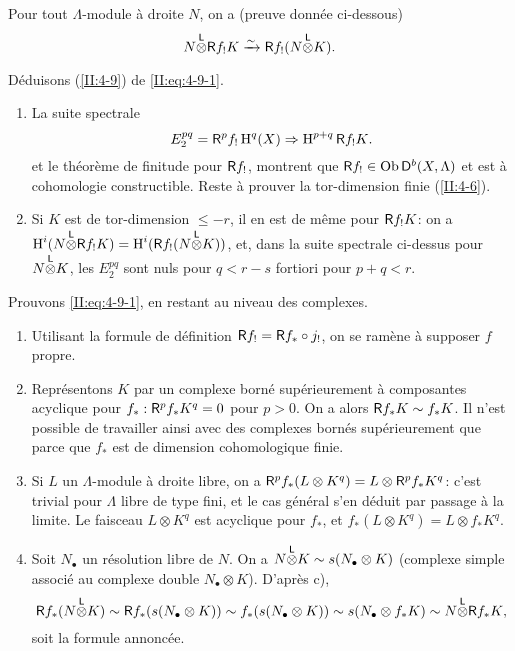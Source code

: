 \documentclass[oneside]{book}
\begin{document}
Pour tout $\Lambda$-module \`a droite $N$, on a (preuve donn\'ee ci-dessous) 
\begin{equation}\label{II:eq:4-9-1}
  N{\overset{\mathsf{L}}{\otimes}} \mathsf{R} f_! K \xrightarrow\sim \mathsf{R} f_! (N{\overset{\mathsf{L}}{\otimes}} K) \text{.}
\end{equation}

D\'eduisons (\ref{II:4-9}) de \eqref{II:eq:4-9-1}. 
\begin{enumerate}[\indent a)]
  \item La suite spectrale 
    \[
      E_2^{p q} = \mathsf{R}^p f_! \operatorname{H}^q(X) \Rightarrow \operatorname{H}^{p+q} \mathsf{R} f_! K \text{.}
    \]
    et le th\'eor\`eme de finitude pour $\mathsf{R} f_!$, montrent que 
    $\mathsf{R} f_!\in \operatorname{Ob} \mathsf{D}^b(X,\Lambda)$ et est \`a cohomologie constructible. 
    Reste \`a prouver la tor-dimension finie (\ref{II:4-6}). 
  \item Si $K$ est de tor-dimension $\leqslant -r$, il en est de m\^eme pour 
    $\mathsf{R} f_! K$: on a $\operatorname{H}^i(N{\overset{\mathsf{L}}{\otimes}} \mathsf{R} f_! K) = \operatorname{H}^i(\mathsf{R} f_!(N{\overset{\mathsf{L}}{\otimes}} K))$, 
    et, dans la suite spectrale ci-dessus pour $N{\overset{\mathsf{L}}{\otimes}} K$, les 
    $E_2^{p q}$ sont nuls pour $q<r-s$ fortiori pour $p+q<r$. 
\end{enumerate}

Prouvons \eqref{II:eq:4-9-1}, en restant au niveau des complexes. 
\begin{enumerate}[\indent a)]
  \item Utilisant la formule de d\'efinition $\mathsf{R} f_! = \mathsf{R} f_*\circ j_!$, on se 
    ram\`ene \`a supposer $f$ propre. 
  \item Repr\'esentons $K$ par un complexe born\'e 
    sup\'erieurement \`a composantes acyclique pour $f_*:\mathsf{R}^p f_* K^q = 0$ 
    pour $p>0$. On a alors $\mathsf{R} f_* K \sim f_* K$. Il n'est possible de 
    travailler ainsi avec des complexes born\'es sup\'erieurement que parce que 
    $f_*$ est de dimension cohomologique finie. 
  \item Si $L$ un $\Lambda$-module \`a droite libre, on a 
    $\mathsf{R}^p f_*(L\otimes K^q) = L\otimes \mathsf{R}^p f_* K^q$: c'est trivial pour 
    $\Lambda$ libre de type fini, et le cas g\'en\'eral s'en d\'eduit par 
    passage \`a la limite. Le faisceau $L\otimes K^q$ est acyclique pour 
    $f_*$, et $f_*(L\otimes K^q) = L\otimes f_* K^q$. 
  \item Soit $N_\bullet$ un r\'esolution libre de $N$. On a 
    $N{\overset{\mathsf{L}}{\otimes}} K\sim s(N_\bullet\otimes K)$ (complexe simple associ\'e au 
    complexe double $N_\bullet\otimes K$). D'apr\`es c), 
    \[
      \mathsf{R} f_*(N{\overset{\mathsf{L}}{\otimes}} K) \sim \mathsf{R} f_* (s(N_\bullet\otimes K)) \sim f_*(s(N_\bullet\otimes K)) \sim s(N_\bullet\otimes f_* K) \sim N{\overset{\mathsf{L}}{\otimes}} \mathsf{R} f_* K \text{,}
    \]
    soit la formule annonc\'ee. 
\end{enumerate}
\end{document}
